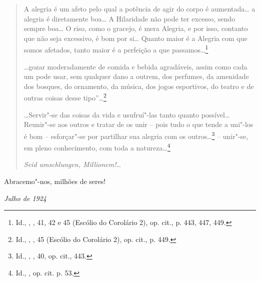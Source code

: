 \begin{quote}
A alegria é um afeto pelo qual a potência de agir do corpo é
aumentada\ldots{} a alegria é diretamente boa\ldots{} A Hilaridade não pode ter
excesso, sendo sempre boa\ldots{} O riso, como o gracejo, é mera Alegria, e
por isso, contanto que não seja excessivo, é bom por si\ldots{} Quanto maior
é a Alegria com que somos afetados, tanto maior é a perfeição a que
passamos\ldots{}\footnote{Id., {}, \scalebox{0.8}{IV}, 41, 42 e 45 (Escólio do
  Corolário 2), op. cit., p. 443, 447, 449.}

\ldots{}gozar moderadamente de comida e bebida agradáveis, assim como cada
um pode usar, sem qualquer dano a outrem, dos perfumes, da amenidade dos
bosques, do ornamento, da música, dos jogos esportivos, do teatro e de
outras coisas desse tipo''\ldots{}\footnote{Id., {}, \scalebox{0.8}{IV}, 45
  (Escólio do Corolário 2), op. cit., p. 449.}

\ldots{}Servir"-se das coisas da vida e usufruí"-las tanto quanto possível\ldots{}
Reunir"-se aos outros e tratar de os unir -- pois tudo o que tende a
uni"-los é bom -- esforçar"-se por partilhar sua alegria com os outros\ldots{}\footnote{Id.,
  {}, \scalebox{0.8}{IV}, 40, op. cit., 443.}
-- unir"-se, em pleno conhecimento, com toda a natureza\ldots{}\footnote{Id.,
  {}, op. cit. p. 53.}

\emph{Seid umschlungen, Millionem!\ldots{}}
\end{quote}

Abracemo"-nos, milhões de seres!

\begin{flushright}
\emph{Julho de 1924}
\end{flushright}